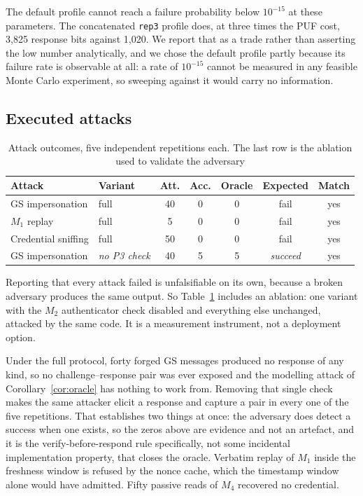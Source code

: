 \documentclass[conference]{IEEEtran}
\begin{document}
The default profile cannot reach a failure probability below $10^{-15}$ at these
parameters. The concatenated \texttt{rep3} profile does, at three times the PUF
cost, 3{,}825 response bits against 1{,}020. We report that as a trade rather
than asserting the low number analytically, and we chose the default profile
partly because its failure rate is observable at all: a rate of $10^{-15}$
cannot be measured in any feasible Monte Carlo experiment, so sweeping against
it would carry no information.

\subsection{Executed attacks}

\begin{table}[H]
\centering
\caption{Attack outcomes, five independent repetitions each. The last row is the
ablation used to validate the adversary}
\label{tab:attacks}
\footnotesize
\setlength{\tabcolsep}{3.5pt}
\begin{tabular}{@{}llccccc@{}}
\toprule
\textbf{Attack} & \textbf{Variant} & \textbf{Att.} & \textbf{Acc.} &
\textbf{Oracle} & \textbf{Expected} & \textbf{Match} \\
\midrule
GS impersonation    & full     & 40 & 0 & 0 & fail    & yes \\
$M_1$ replay        & full     &  5 & 0 & 0 & fail    & yes \\
Credential sniffing & full     & 50 & 0 & 0 & fail    & yes \\
\midrule
GS impersonation    & \emph{no P3 check} & 40 & 5 & 5 & \emph{succeed} & yes \\
\bottomrule
\end{tabular}
\end{table}

Reporting that every attack failed is unfalsifiable on its own, because a broken
adversary produces the same output. So Table~\ref{tab:attacks} includes an
ablation: one variant with the $M_2$ authenticator check disabled and everything
else unchanged, attacked by the same code. It is a measurement instrument, not a
deployment option.

Under the full protocol, forty forged GS messages produced no response of any
kind, so no challenge--response pair was ever exposed and the modelling attack
of Corollary~\ref{cor:oracle} has nothing to work from. Removing that single
check makes the same attacker elicit a response and capture a pair in every one
of the five repetitions. That establishes two things at once: the adversary does
detect a success when one exists, so the zeros above are evidence and not an
artefact, and it is the verify-before-respond rule specifically, not some
incidental implementation property, that closes the oracle. Verbatim replay of
$M_1$ inside the freshness window is refused by the nonce cache, which the
timestamp window alone would have admitted. Fifty passive reads of $M_4$
recovered no credential.
\end{document}
